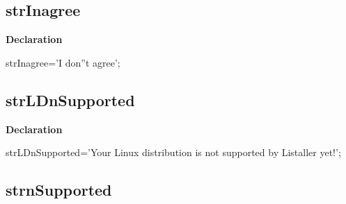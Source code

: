 \documentclass{report}
\newif\ifpdf
\begin{document}
\subsection*{strInagree}
\fi
\label{trstrings-strInagree}
\begin{list}{}{
\setlength{\itemindent}{0cm}
\setlength{\listparindent}{0cm}
\setlength{\leftmargin}{\evensidemargin}
\addtolength{\leftmargin}{\tmplength}
\settowidth{\labelsep}{X}
\addtolength{\leftmargin}{\labelsep}
\setlength{\labelwidth}{\tmplength}
}
\item[\textbf{Declaration}\hfill]
\ifpdf
\begin{flushleft}
\fi
\begin{ttfamily}
strInagree='I don''t agree';\end{ttfamily}

\ifpdf
\end{flushleft}
\fi

\end{list}
\ifpdf
\subsection*{\large{\textbf{strLDnSupported}}\normalsize\hspace{1ex}\hrulefill}
\else
\subsection*{strLDnSupported}
\fi
\label{trstrings-strLDnSupported}
\begin{list}{}{
\setlength{\itemindent}{0cm}
\setlength{\listparindent}{0cm}
\setlength{\leftmargin}{\evensidemargin}
\addtolength{\leftmargin}{\tmplength}
\settowidth{\labelsep}{X}
\addtolength{\leftmargin}{\labelsep}
\setlength{\labelwidth}{\tmplength}
}
\item[\textbf{Declaration}\hfill]
\ifpdf
\begin{flushleft}
\fi
\begin{ttfamily}
strLDnSupported='Your Linux distribution is not supported by Listaller yet!';\end{ttfamily}

\ifpdf
\end{flushleft}
\fi

\end{list}
\ifpdf
\subsection*{\large{\textbf{strnSupported}}\normalsize\hspace{1ex}\hrulefill}
\else
\end{document}
